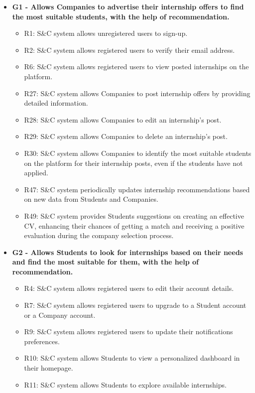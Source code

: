 \begin{itemize}
    \item \textbf{G1 - Allows Companies to advertise their internship offers to find the most suitable students, with the help of recommendation.}
    \begin{itemize}
        \item R1: S\&C system allows unregistered users to sign-up.
        \item R2: S\&C system allows registered users to verify their email address.
        \item R6: S\&C system allows registered users to view posted internships on the platform.
        \item R27: S\&C system allows Companies to post internship offers by providing detailed information.
        \item R28: S\&C system allows Companies to edit an internship's post.
        \item R29: S\&C system allows Companies to delete an internship's post.
        \item R30: S\&C system allows Companies to identify the most suitable students on the platform for their internship posts, even if the students have not applied.
        \item R47: S\&C system periodically updates internship recommendations based on new data from Students and Companies.
        \item R49: S\&C system provides Students suggestions on creating an effective CV, enhancing their chances of getting a match and receiving a positive evaluation during the company selection process.
    \end{itemize}
    \item \textbf{G2 - Allows Students to look for internships based on their needs and find the most suitable for them, with the help of recommendation.}
    \begin{itemize}
        \item R4: S\&C system allows registered users to edit their account details.
        \item R7: S\&C system allows registered users to upgrade to a Student account or a Company account.
        \item R9: S\&C system allows registered users to update their notifications preferences.
        \item R10: S\&C system allows Students to view a personalized dashboard in their homepage.
        \item R11: S\&C system allows Students to explore available internships.

\end{itemize}
\end{itemize}
